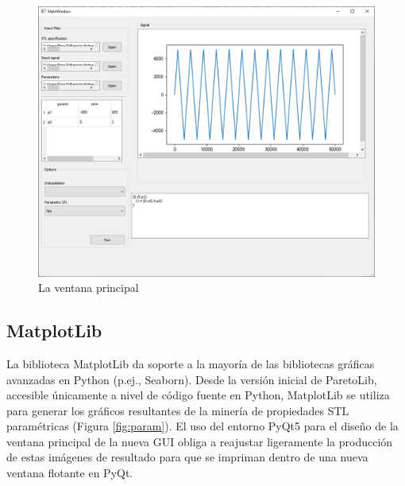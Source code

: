 \begin{figure}[htb]
\centering
  \includegraphics[width=1.0\linewidth]{images/gui} 
\caption{La ventana principal}
\label{fig:gui}
\end{figure}

 
 
 
 
\subsection{MatplotLib}
La biblioteca MatplotLib da soporte a la mayoría de las bibliotecas gráficas avanzadas en Python (p.ej., Seaborn). Desde la versión inicial de ParetoLib, accesible únicamente a nivel de código fuente en Python, MatplotLib se utiliza para generar los gráficos resultantes de la minería de propiedades STL paramétricas (Figura \ref{fig:param}). El uso del entorno PyQt5 para el diseño de la ventana principal de la nueva GUI obliga a reajustar ligeramente la producción de estas imágenes de resultado para que se impriman dentro de una nueva ventana flotante en PyQt.
 

